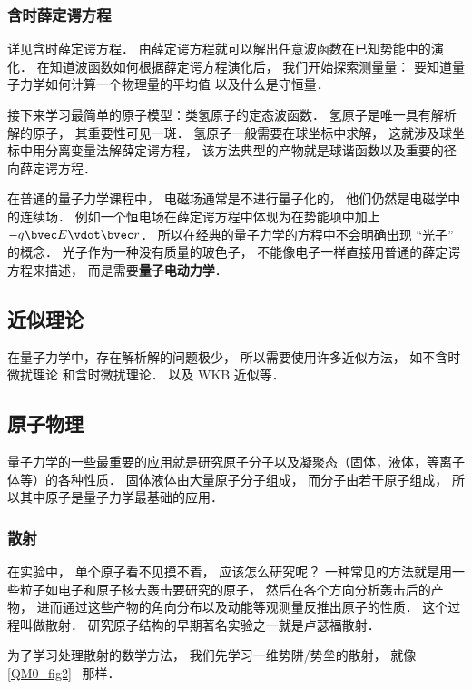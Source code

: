 \subsubsection{含时薛定谔方程}
详见含时薛定谔方程． 由薛定谔方程就可以解出任意波函数在已知势能中的演化． 在知道波函数如何根据薛定谔方程演化后， 我们开始探索测量量： 要知道量子力学如何计算一个物理量的平均值 以及什么是守恒量．

接下来学习最简单的原子模型：类氢原子的定态波函数． 氢原子是唯一具有解析解的原子， 其重要性可见一斑． 氢原子一般需要在球坐标中求解， 这就涉及球坐标中用分离变量法解薛定谔方程， 该方法典型的产物就是球谐函数以及重要的径向薛定谔方程．

在普通的量子力学课程中， 电磁场通常是不进行量子化的， 他们仍然是电磁学中的连续场． 例如一个恒电场在薛定谔方程中体现为在势能项中加上 $-q\bvec E \vdot \bvec r$． 所以在经典的量子力学的方程中不会明确出现 “光子” 的概念． 光子作为一种没有质量的玻色子， 不能像电子一样直接用普通的薛定谔方程来描述， 而是需要\textbf{量子电动力学}．

\subsection{近似理论}
在量子力学中，存在解析解的问题极少， 所以需要使用许多近似方法， 如不含时微扰理论 和含时微扰理论． 以及 WKB 近似等．

\subsection{原子物理}
量子力学的一些最重要的应用就是研究原子分子以及凝聚态（固体，液体，等离子体等）的各种性质． 固体液体由大量原子分子组成， 而分子由若干原子组成， 所以其中原子是量子力学最基础的应用．

\subsubsection{散射}
在实验中， 单个原子看不见摸不着， 应该怎么研究呢？ 一种常见的方法就是用一些粒子如电子和原子核去轰击要研究的原子， 然后在各个方向分析轰击后的产物， 进而通过这些产物的角向分布以及动能等观测量反推出原子的性质． 这个过程叫做散射． 研究原子结构的早期著名实验之一就是卢瑟福散射．

为了学习处理散射的数学方法， 我们先学习一维势阱/势垒的散射， 就像\autoref{QM0_fig2}~ 那样．


